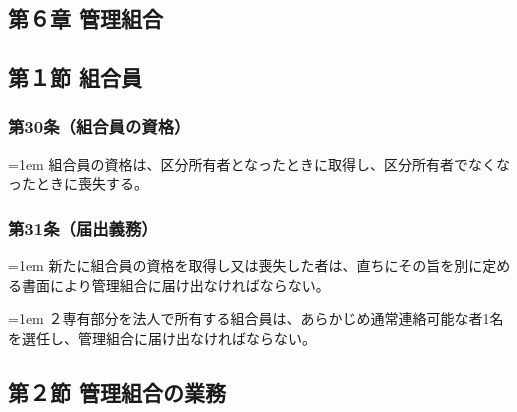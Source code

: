 \documentclass[
  luatex,
  paper=a4paper,
  fontsize=11pt,
  jafontsize=11pt,
  jlreq_notes,
]{jlreq}
\newcommand{\joumain}[1]{%
  \noindent\hangindent=1em\hangafter=1
  \hspace{1em}#1%
}
\newcommand{\kou}[2]{%
  \par\noindent\hangindent=1em\hangafter=1
  #1\hspace{1em}#2%
}
\begin{document}
  \begin{center}
  \subsection*{第６章 管理組合}
  \subsection*{第１節 組合員}
  \end{center}

  \subsubsection*{第30条（組合員の資格）}
  \joumain{組合員の資格は、区分所有者となったときに取得し、区分所有者でなくなったときに喪失する。}

  \subsubsection*{第31条（届出義務）}
  \joumain{新たに組合員の資格を取得し又は喪失した者は、直ちにその旨を別に定める書面により管理組合に届け出なければならない。}
  \kou{２}{専有部分を法人で所有する組合員は、あらかじめ通常連絡可能な者1名を選任し、管理組合に届け出なければならない。}
  
  \begin{center}
  \subsection*{第２節 管理組合の業務}
  \end{center}
\end{document}
